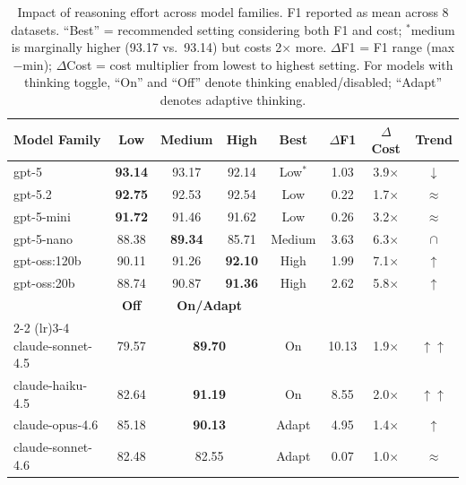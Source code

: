 \documentclass[runningheads]{llncs}
\begin{document}
\begin{table}[htbp]
\centering
\caption{Impact of reasoning effort across model families. F1 reported as mean across 8 datasets. ``Best'' = recommended setting considering both F1 and cost; $^\ast$medium is marginally higher (93.17 vs.\ 93.14) but costs 2$\times$ more. $\Delta$F1 = F1 range (max$-$min); $\Delta$Cost = cost multiplier from lowest to highest setting. For models with thinking toggle, ``On'' and ``Off'' denote thinking enabled/disabled; ``Adapt'' denotes adaptive thinking.}
\label{tab:reasoning_effort}
\small
\setlength{\tabcolsep}{3pt}
\begin{tabular}{lccccccc}
\toprule
\textbf{Model Family} & \textbf{Low} & \textbf{Medium} & \textbf{High} & \textbf{Best} & \textbf{$\Delta$F1} & \textbf{$\Delta$Cost} & \textbf{Trend} \\
\midrule
gpt-5        & \textbf{93.14} & 93.17 & 92.14 & Low$^\ast$  & 1.03 & 3.9$\times$ & $\downarrow$ \\
gpt-5.2      & \textbf{92.75} & 92.53 & 92.54 & Low  & 0.22 & 1.7$\times$ & $\approx$ \\
gpt-5-mini   & \textbf{91.72} & 91.46 & 91.62 & Low  & 0.26 & 3.2$\times$ & $\approx$ \\
gpt-5-nano   & 88.38 & \textbf{89.34} & 85.71 & Medium  & 3.63 & 6.3$\times$ & $\cap$ \\
gpt-oss:120b & 90.11 & 91.26 & \textbf{92.10} & High & 1.99 & 7.1$\times$ & $\uparrow$ \\
gpt-oss:20b  & 88.74 & 90.87 & \textbf{91.36} & High & 2.62 & 5.8$\times$ & $\uparrow$ \\
\midrule
 & \textbf{Off} & \multicolumn{2}{c}{\textbf{On/Adapt}} & & & & \\
\cmidrule(lr){2-2} \cmidrule(lr){3-4}
claude-sonnet-4.5 & 79.57 & \multicolumn{2}{c}{\textbf{89.70}} & On & 10.13 & 1.9$\times$ & $\uparrow\uparrow$ \\
claude-haiku-4.5  & 82.64 & \multicolumn{2}{c}{\textbf{91.19}} & On & 8.55 & 2.0$\times$ & $\uparrow\uparrow$ \\
claude-opus-4.6   & 85.18 & \multicolumn{2}{c}{\textbf{90.13}} & Adapt & 4.95 & 1.4$\times$ & $\uparrow$ \\
claude-sonnet-4.6 & 82.48 & \multicolumn{2}{c}{82.55} & Adapt & 0.07 & 1.0$\times$ & $\approx$ \\

\end{tabular}
\end{table}
\end{document}
